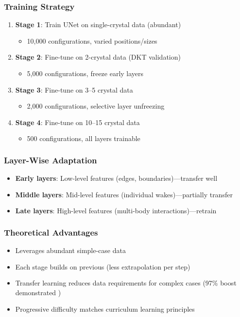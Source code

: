 \subsubsection{Training Strategy}
\begin{enumerate}
    \item \textbf{Stage 1}: Train UNet on single-crystal data (abundant)
    \begin{itemize}
        \item 10,000 configurations, varied positions/sizes
    \end{itemize}
    \item \textbf{Stage 2}: Fine-tune on 2-crystal data (DKT validation)
    \begin{itemize}
        \item 5,000 configurations, freeze early layers
    \end{itemize}
    \item \textbf{Stage 3}: Fine-tune on 3--5 crystal data
    \begin{itemize}
        \item 2,000 configurations, selective layer unfreezing
    \end{itemize}
    \item \textbf{Stage 4}: Fine-tune on 10--15 crystal data
    \begin{itemize}
        \item 500 configurations, all layers trainable
    \end{itemize}
\end{enumerate}

\subsubsection{Layer-Wise Adaptation}
\begin{itemize}
    \item \textbf{Early layers}: Low-level features (edges, boundaries)---transfer well
    \item \textbf{Middle layers}: Mid-level features (individual wakes)---partially transfer
    \item \textbf{Late layers}: High-level features (multi-body interactions)---retrain
\end{itemize}

\subsubsection{Theoretical Advantages}
\begin{itemize}
    \item Leverages abundant simple-case data
    \item Each stage builds on previous (less extrapolation per step)
    \item Transfer learning reduces data requirements for complex cases (97\% boost demonstrated \cite{pellegrin2022})
    \item Progressive difficulty matches curriculum learning principles
\end{itemize}

